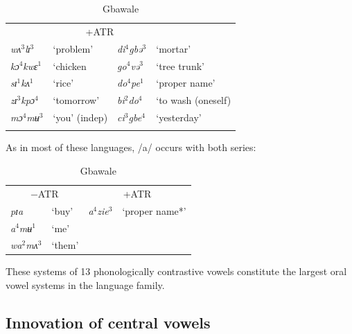 \documentclass[output=paper,newtxmath,modfonts,nonflat,draft]{langsci/langscibook}
\begin{document}
\begin{table}
\label{tab:zogbo:9}
\caption{Gbawale \citep{Seri1987}}
\begin{tabular}{llll}
\lsptoprule
\multicolumn{2}{c}{−ATR} & \multicolumn{2}{c}{+ATR}\\

\textit{wʌ}$^3$\textit{lɪ}$^3$  &  ‘problem’  &     \textit{di}$^4$\textit{gbə}$^3$ & ‘mortar’ \\

\textit{kɔ}$^4$\textit{kwɛ}$^1$ & ‘chicken &      \textit{go}$^4$\textit{və}$^3$ &  ‘tree trunk’\\

\textit{sɪ}$^1$\textit{kʌ}$^1$ & ‘rice’  &       \textit{do}$^4$\textit{pe}$^1$ &  ‘proper name’ \\ 

\textit{zɪ}$^3$\textit{kpɔ}$^4$ & ‘tomorrow’   &    \textit{bi}$^2$\textit{do}$^4$ &  ‘to wash (oneself)\\

\textit{mɔ}$^4$\textit{mʉ}$^3$ & ‘you’ (indep)   &   \textit{ci}$^3$\textit{gbe}$^4$ & ‘yesterday’\\
\lspbottomrule
\end{tabular}
\end{table}

As in most of these languages, /a/ occurs with both series: 

 

\begin{table}
\label{ex:zogbo:10}
\caption{Gbawale \citep{Seri1987}}
\begin{tabular}{llll}
\multicolumn{2}{c}{−ATR} & \multicolumn{2}{c}{+ATR} \\

\textit{pɪa}  & ‘buy’ & \textit{a}$^4$\textit{zie}$^3$ & ‘proper name*’ \\ 

\textit{a}$^4$\textit{mʉ}$^1$ & ‘me’ \\

\textit{wa}$^2$\textit{mʌ}$^3$ & ‘them’ \\
\end{tabular}
\end{table}

These systems of 13 phonologically contrastive vowels constitute the largest oral vowel systems in the  language family.  

\subsection{Innovation of central vowels}\label{sec:zogbo:2.1} 
\end{document}
